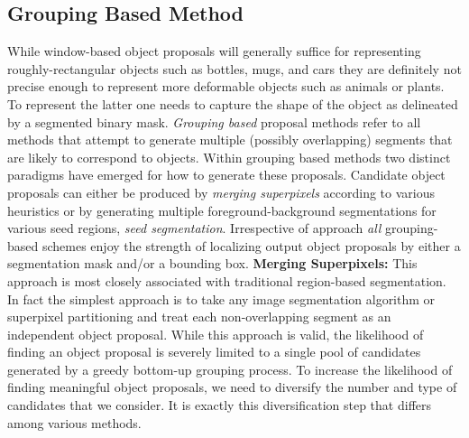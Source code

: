 \subsection{Grouping Based Method}
\label{sec:grouping_methods}
While window-based object proposals will generally suffice for representing roughly-rectangular objects such as bottles, mugs, and cars they are definitely not precise enough to represent more deformable objects such as animals or plants. To represent the latter one needs to capture the shape of the object as delineated by a segmented binary mask. \emph{Grouping based} proposal methods refer to all methods that attempt to generate multiple (possibly overlapping) segments that are likely to correspond to objects. Within grouping based methods two distinct paradigms have emerged for how to generate these proposals. Candidate object proposals can either be produced by \emph{merging superpixels} according to various heuristics or by generating multiple foreground-background segmentations for various seed regions, \emph{seed segmentation}. Irrespective of approach \emph{all} grouping-based schemes enjoy the strength of localizing output object proposals by either a segmentation mask and/or a bounding box. 
\newline
\newline
\noindent
{\bf Merging Superpixels:} This approach is most closely associated with traditional region-based segmentation. In fact the simplest approach is to take any image segmentation algorithm or superpixel partitioning and treat each non-overlapping segment as an independent object proposal. While this approach is valid, the likelihood of finding an object proposal is severely limited to a single pool of candidates generated by a greedy bottom-up grouping process. To increase the likelihood of finding meaningful object proposals, we need to diversify the number and type of candidates that we consider. It is exactly this diversification step that differs among various methods. 


